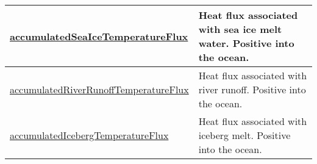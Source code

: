 {\begin{center}
\begin{longtable}{| p{2.0in} | p{4.0in} |}
    \hline
    \hyperref[subsec:var_sec_conservationCheckEnergyAM_accumulatedSeaIceTemperatureFlux]{accumulatedSeaIceTemperature\-Flux} & Heat flux associated with sea ice melt water. Positive into the ocean. \\
    \hline
    \hyperref[subsec:var_sec_conservationCheckEnergyAM_accumulatedRiverRunoffTemperatureFlux]{accumulatedRiverRunoff\-TemperatureFlux} & Heat flux associated with river runoff. Positive into the ocean. \\
    \hline
    \hyperref[subsec:var_sec_conservationCheckEnergyAM_accumulatedIcebergTemperatureFlux]{accumulatedIcebergTemperature\-Flux} & Heat flux associated with iceberg melt. Positive into the ocean. \\
    \hline
\end{longtable}
\end{center}
}
